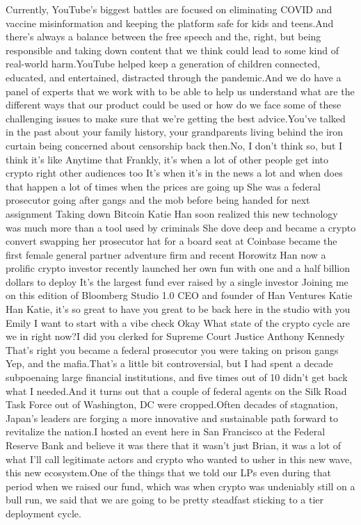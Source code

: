 \documentclass{article}%
\begin{document}
Currently, YouTube's biggest battles are focused on eliminating COVID and vaccine misinformation and keeping the platform safe for kids and teens.And there's always a balance between the free speech and the, right, but being responsible and taking down content that we think could lead to some kind of real{-}world harm.YouTube helped keep a generation of children connected, educated, and entertained, distracted through the pandemic.And we do have a panel of experts that we work with to be able to help us understand what are the different ways that our product could be used or how do we face some of these challenging issues to make sure that we're getting the best advice.You've talked in the past about your family history, your grandparents living behind the iron curtain being concerned about censorship back then.No, I don't think so, but I think it's like Anytime that Frankly, it's when a lot of other people get into crypto right other audiences too It's when it's in the news a lot and when does that happen a lot of times when the prices are going up She was a federal prosecutor going after gangs and the mob before being handed for next assignment Taking down Bitcoin Katie Han soon realized this new technology was much more than a tool used by criminals She dove deep and became a crypto convert swapping her prosecutor hat for a board seat at Coinbase became the first female general partner adventure firm and recent Horowitz Han now a prolific crypto investor recently launched her own fun with one and a half billion dollars to deploy It's the largest fund ever raised by a single investor Joining me on this edition of Bloomberg Studio 1.0 CEO and founder of Han Ventures Katie Han Katie, it's so great to have you great to be back here in the studio with you Emily I want to start with a vibe check Okay What state of the crypto cycle are we in right now?I did you clerked for Supreme Court Justice Anthony Kennedy That's right you became a federal prosecutor you were taking on prison gangs Yep, and the mafia.That's a little bit controversial, but I had spent a decade subpoenaing large financial institutions, and five times out of 10 didn't get back what I needed.And it turns out that a couple of federal agents on the Silk Road Task Force out of Washington, DC were cropped.Often decades of stagnation, Japan's leaders are forging a more innovative and sustainable path forward to revitalize the nation.I hosted an event here in San Francisco at the Federal Reserve Bank and believe it was there that it wasn't just Brian, it was a lot of what I'll call legitimate actors and crypto who wanted to usher in this new wave, this new ecosystem.One of the things that we told our LPs even during that period when we raised our fund, which was when crypto was undeniably still on a bull run, we said that we are going to be pretty steadfast sticking to a tier deployment cycle.%
\end{document}
